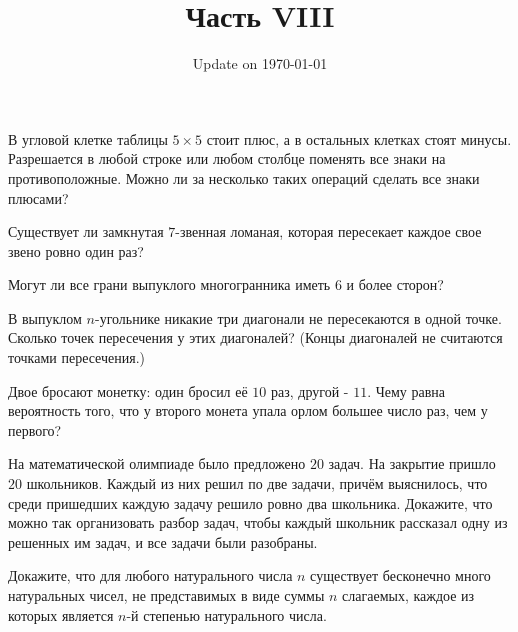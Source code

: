\documentclass[12pt]{article}
\begin{document}
\fontsize{12}{12}\selectfont

\title{\bf \huge Часть VIII}
\date{Update on \today}
\maketitle  

\begin{task}
В угловой клетке таблицы $5 \times 5$ стоит плюс, а в остальных клетках стоят минусы. Разрешается в любой строке или любом столбце поменять все знаки на противоположные. Можно ли за несколько таких операций сделать все знаки плюсами?
\end{task}

\begin{task}
Существует ли замкнутая $7$-звенная ломаная, которая пересекает каждое свое звено ровно один раз?
\end{task}

\begin{task}
Могут ли все грани выпуклого многогранника иметь $6$ и более сторон?
\end{task}

\begin{task}
В выпуклом $n$-угольнике никакие три диагонали не пересекаются в одной точке. Сколько точек пересечения у этих диагоналей? (Концы диагоналей не считаются точками пересечения.)
\end{task}

\begin{task}
Двое бросают монетку: один бросил её $10$ раз, другой - $11$. Чему равна вероятность того, что у второго монета упала орлом большее число раз, чем у первого?
\end{task}

\begin{task}
На математической олимпиаде было предложено $20$ задач. На закрытие пришло $20$ школьников. Каждый из них решил по две задачи, причём выяснилось, что среди пришедших каждую задачу решило ровно два школьника. Докажите, что можно так организовать разбор задач, чтобы каждый школьник рассказал одну из решенных им задач, и все задачи были разобраны.
\end{task}

\begin{task}
Докажите, что для любого натурального числа $n$ существует бесконечно много натуральных чисел, не представимых в виде суммы $n$ слагаемых, каждое из которых является $n$-й степенью натурального числа.
\end{task}
\end{document}
